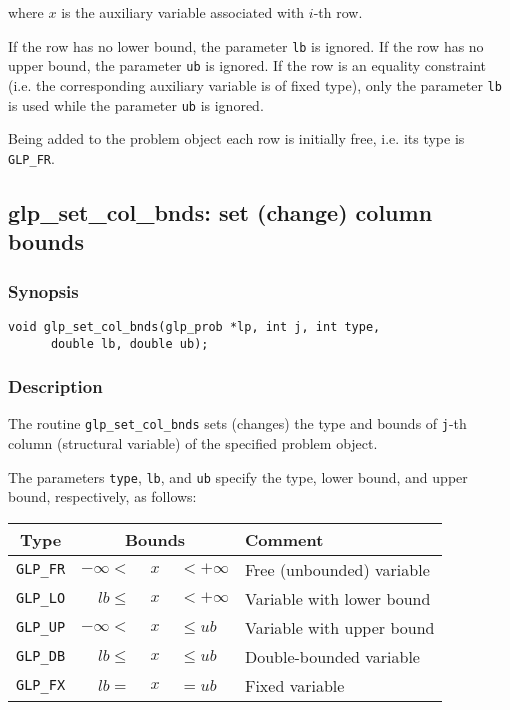 \noindent
where $x$ is the auxiliary variable associated with $i$-th row.

If the row has no lower bound, the parameter \verb|lb| is ignored. If
the row has no upper bound, the parameter \verb|ub| is ignored. If the
row is an equality constraint (i.e. the corresponding auxiliary variable
is of fixed type), only the parameter \verb|lb| is used while the
parameter \verb|ub| is ignored.

Being added to the problem object each row is initially free, i.e. its
type is \verb|GLP_FR|.

\newpage

\subsection{glp\_set\_col\_bnds: set (change) column bounds}

\subsubsection*{Synopsis}

\begin{verbatim}
void glp_set_col_bnds(glp_prob *lp, int j, int type,
      double lb, double ub);
\end{verbatim}

\subsubsection*{Description}

The routine \verb|glp_set_col_bnds| sets (changes) the type and bounds
of \verb|j|-th column (structural variable) of the specified problem
object.

The parameters \verb|type|, \verb|lb|, and \verb|ub| specify the type,
lower bound, and upper bound, respectively, as follows:

\begin{center}
\begin{tabular}{cr@{}c@{}ll}
Type & \multicolumn{3}{c}{Bounds} & Comment \\
\hline
\verb|GLP_FR| & $-\infty <$ &$\ x\ $& $< +\infty$
   & Free (unbounded) variable \\
\verb|GLP_LO| & $lb \leq$ &$\ x\ $& $< +\infty$
   & Variable with lower bound \\
\verb|GLP_UP| & $-\infty <$ &$\ x\ $& $\leq ub$
   & Variable with upper bound \\
\verb|GLP_DB| & $lb \leq$ &$\ x\ $& $\leq ub$
   & Double-bounded variable \\
\verb|GLP_FX| & $lb =$ &$\ x\ $& $= ub$
   & Fixed variable \\
\end{tabular}
\end{center}

